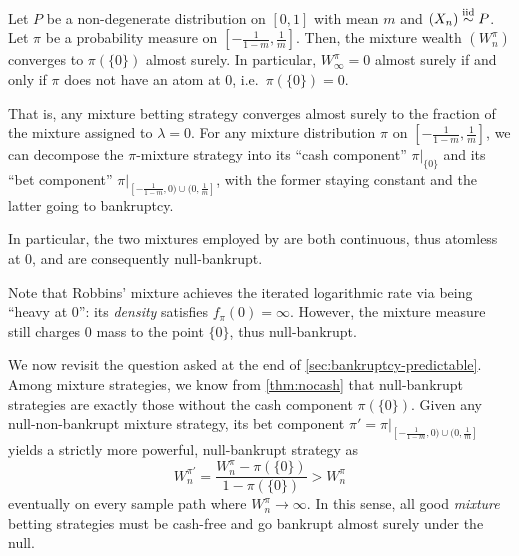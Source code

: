 \begin{theorem}\label{thm:nocash} Let $P$ be a non-degenerate distribution on $[0,1]$ with mean $m$ and $(X_n)\overset{\mathrm{iid}}{\sim} P$.
Let $\pi$ be a probability measure  on $[-\frac{1}{1-m}, \frac{1}{m}]$. Then, the mixture wealth $(W_n^\pi)$ converges to $\pi(\{0\})$ almost surely. In particular, $W_\infty^\pi = 0$ almost surely if and only if $\pi$ does not have an atom at 0, i.e.\ $\pi(\{0\}) = 0$.
\end{theorem}
That is, any mixture betting strategy converges almost surely to the fraction of the mixture assigned to $\lambda = 0$. For any mixture distribution $\pi$ on $[-\frac{1}{1-m}, \frac{1}{m}]$, we can decompose the $\pi$-mixture strategy into its ``cash component'' $\pi|_{\{0\}}$ and its ``bet component'' $\pi|_{[-\frac{1}{1-m},0)\cup(0, \frac{1}{m}] }$, with the former staying constant and the latter going to bankruptcy.


In particular, the two mixtures employed by \cite{orabona2023tight} are both continuous, thus atomless at 0, and are consequently null-bankrupt.
Note that Robbins' mixture achieves the iterated logarithmic rate via being ``heavy at 0'': its \emph{density} satisfies $f_\pi(0) = \infty$. However, the mixture measure still charges 0 mass to the point $\{ 0 \}$, thus null-bankrupt.


We now revisit the question asked at the end of \cref{sec:bankruptcy-predictable}. Among mixture strategies, we know from \cref{thm:nocash} that null-bankrupt strategies are exactly those without the cash component $\pi(\{0\})$. Given any null-non-bankrupt mixture strategy, its bet component $\pi' = \pi|_{[-\frac{1}{1-m},0)\cup(0, \frac{1}{m}] }$ yields a strictly more powerful,  null-bankrupt strategy as
\begin{equation}\label{eqn:remove-cash}
    W^{\pi'}_n = \frac{W_n^\pi - \pi(\{ 0 \})}{1-\pi(\{ 0 \})} > W_n^\pi
\end{equation}
eventually on every sample path where $W^\pi_n \to \infty$. In this sense, all good \emph{mixture} betting strategies must be cash-free and go bankrupt almost surely under the null.

